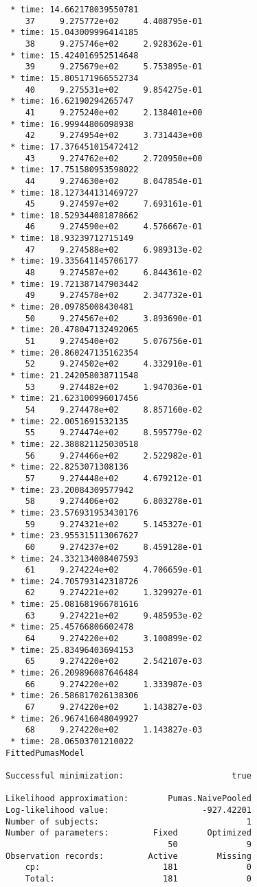 \documentclass[12pt,a4paper]{article}
\begin{document}
\begin{lstlisting}
 * time: 14.662178039550781
    37     9.275772e+02     4.408795e-01
 * time: 15.043009996414185
    38     9.275746e+02     2.928362e-01
 * time: 15.424016952514648
    39     9.275679e+02     5.753895e-01
 * time: 15.805171966552734
    40     9.275531e+02     9.854275e-01
 * time: 16.62190294265747
    41     9.275240e+02     2.138401e+00
 * time: 16.99944806098938
    42     9.274954e+02     3.731443e+00
 * time: 17.376451015472412
    43     9.274762e+02     2.720950e+00
 * time: 17.751580953598022
    44     9.274630e+02     8.047854e-01
 * time: 18.127344131469727
    45     9.274597e+02     7.693161e-01
 * time: 18.529344081878662
    46     9.274590e+02     4.576667e-01
 * time: 18.93239712715149
    47     9.274588e+02     6.989313e-02
 * time: 19.335641145706177
    48     9.274587e+02     6.844361e-02
 * time: 19.721387147903442
    49     9.274578e+02     2.347732e-01
 * time: 20.09785008430481
    50     9.274567e+02     3.893690e-01
 * time: 20.478047132492065
    51     9.274540e+02     5.076756e-01
 * time: 20.860247135162354
    52     9.274502e+02     4.332910e-01
 * time: 21.242058038711548
    53     9.274482e+02     1.947036e-01
 * time: 21.623100996017456
    54     9.274478e+02     8.857160e-02
 * time: 22.0051691532135
    55     9.274474e+02     8.595779e-02
 * time: 22.388821125030518
    56     9.274466e+02     2.522982e-01
 * time: 22.8253071308136
    57     9.274448e+02     4.679212e-01
 * time: 23.20084309577942
    58     9.274406e+02     6.803278e-01
 * time: 23.576931953430176
    59     9.274321e+02     5.145327e-01
 * time: 23.955315113067627
    60     9.274237e+02     8.459128e-01
 * time: 24.332134008407593
    61     9.274224e+02     4.706659e-01
 * time: 24.705793142318726
    62     9.274221e+02     1.329927e-01
 * time: 25.081681966781616
    63     9.274221e+02     9.485953e-02
 * time: 25.45766806602478
    64     9.274220e+02     3.100899e-02
 * time: 25.83496403694153
    65     9.274220e+02     2.542107e-03
 * time: 26.209896087646484
    66     9.274220e+02     1.333987e-03
 * time: 26.586817026138306
    67     9.274220e+02     1.143827e-03
 * time: 26.967416048049927
    68     9.274220e+02     1.143827e-03
 * time: 28.06503701210022
FittedPumasModel

Successful minimization:                      true

Likelihood approximation:        Pumas.NaivePooled
Log-likelihood value:                   -927.42201
Number of subjects:                              1
Number of parameters:         Fixed      Optimized
                                 50              9
Observation records:         Active        Missing
    cp:                         181              0
    Total:                      181              0


\end{lstlisting}
\end{document}
